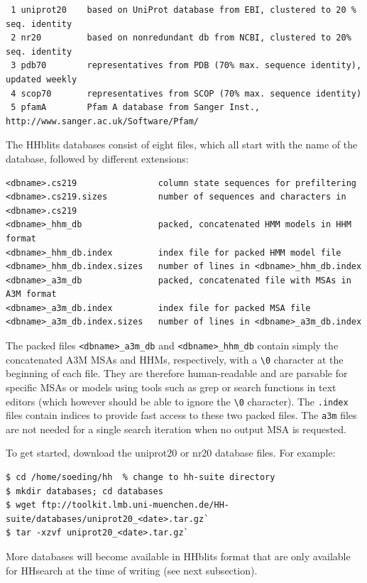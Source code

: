 \documentclass[11pt,a4paper]{article}
\begin{document}
\small 
\begin{verbatim}
 1 uniprot20    based on UniProt database from EBI, clustered to 20 % seq. identity
 2 nr20         based on nonredundant db from NCBI, clustered to 20% seq. identity
 3 pdb70        representatives from PDB (70% max. sequence identity), updated weekly
 4 scop70       representatives from SCOP (70% max. sequence identity)
 5 pfamA        Pfam A database from Sanger Inst., http://www.sanger.ac.uk/Software/Pfam/
\end{verbatim} 
\normalsize

The HHblits databases consist of eight files, which all start with the name of the database, followed by different extensions:
\begin{verbatim}
<dbname>.cs219                column state sequences for prefiltering
<dbname>.cs219.sizes          number of sequences and characters in <dbname>.cs219  
<dbname>_hhm_db               packed, concatenated HMM models in HHM format
<dbname>_hhm_db.index         index file for packed HMM model file
<dbname>_hhm_db.index.sizes   number of lines in <dbname>_hhm_db.index
<dbname>_a3m_db               packed, concatenated file with MSAs in A3M format
<dbname>_a3m_db.index         index file for packed MSA file
<dbname>_a3m_db.index.sizes   number of lines in <dbname>_a3m_db.index
\end{verbatim}

The packed files \verb`<dbname>_a3m_db` and \verb`<dbname>_hhm_db` contain simply the concatenated A3M MSAs and HHMs, respectively, with a \verb`\0` character at the beginning of each file. They are therefore human-readable and are parsable for specific MSAs or models using tools such as grep or search functions in text editors (which however should be able to ignore the \verb`\0` character). The \verb`.index` files contain indices to provide fast access to these two packed files. The \verb`a3m` files are not needed for a single search iteration when no output MSA is requested. 

To get started, download the uniprot20 or nr20 database files. For example:
\begin{verbatim}
$ cd /home/soeding/hh  % change to hh-suite directory
$ mkdir databases; cd databases
$ wget ftp://toolkit.lmb.uni-muenchen.de/HH-suite/databases/uniprot20_<date>.tar.gz`
$ tar -xzvf uniprot20_<date>.tar.gz`
\end{verbatim}

More databases will become available in HHblits format that are only available for HHsearch at the time of writing (see next subsection).
\end{document}
